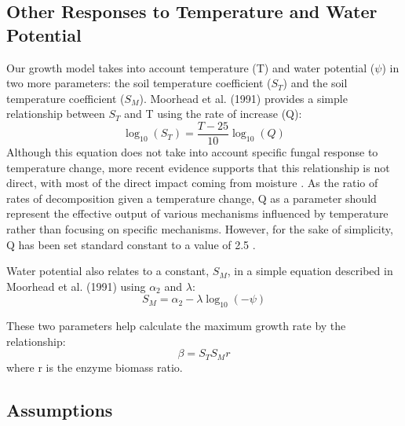 \documentclass[12pt]{article}
\begin{document}
\begin{multicols}{2}
	
\subsection{Other Responses to Temperature and Water Potential}

Our growth model takes into account temperature (T) and water potential ($\psi$) in two more parameters: the soil temperature coefficient ($S_T$) and the soil temperature coefficient ($S_M$). Moorhead et al. (1991) provides a simple relationship between $S_T$ and T using the rate of increase (Q):
\begin{equation}
\log_{10}(S_T) = \frac{T-25}{10}\log_{10}(Q)
\end{equation}
Although this equation does not take into account specific fungal response to temperature change, more recent evidence supports that this relationship is not direct, with most of the direct impact coming from moisture \cite{Petraglia2018}. As the ratio of rates of decomposition given a temperature change, Q as a parameter should represent the effective output of various mechanisms influenced by temperature rather than focusing on specific mechanisms. However, for the sake of simplicity, Q has been set standard constant to a value of 2.5 \cite{Moorhead1991}.

Water potential also relates to a constant, $S_M$, in a simple equation described in Moorhead et al. (1991) using $\alpha_2$ and $\lambda$:
\begin{equation}
S_M = \alpha_2 -\lambda \log_{10}(-\psi)
\end{equation}

These two parameters help calculate the maximum growth rate by the relationship:
\begin{equation}
\beta = S_T S_M r
\end{equation}
where r is the enzyme biomass ratio.

\subsection{Assumptions}

\end{multicols}
\end{document}
